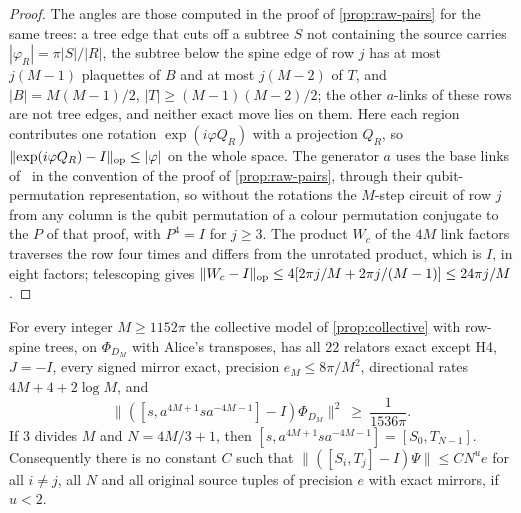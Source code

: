 \begin{proof}
The angles are those computed in the proof of \cref{prop:raw-pairs} for the same trees: a tree edge that cuts off a subtree $S$ not
containing the source carries $|\varphi_R|=\pi|S|/|R|$, the subtree below the spine edge of row $j$ has at most $j(M-1)$ plaquettes of $B$
and at most $j(M-2)$ of $T$, and $|B|=M(M-1)/2$, $|T|\ge(M-1)(M-2)/2$; the other $a$-links of these rows are not tree edges, and neither
exact move lies on them. Here each region contributes one rotation $\exp(i\varphi Q_R)$ with a projection $Q_R$, so
$\lVert \exp(i\varphi Q_R)-I\rVert_{\mathrm{op}}\le|\varphi|$ on the whole space. The generator $a$ uses the base links of~\cite[\S6]{DM-H3} in the convention of
the proof of \cref{prop:raw-pairs}, through their qubit-permutation representation, so without the rotations the $M$-step circuit of
row $j$ from any column is the qubit permutation of a colour permutation conjugate to the $P$ of that proof, with $P^4=I$ for $j\ge3$.
The product $W_c$ of the $4M$ link factors traverses the row four times and differs from the unrotated product, which is $I$, in eight
factors; telescoping gives $\lVert W_c-I\rVert_{\mathrm{op}}\le4[2\pi j/M+2\pi j/(M-1)]\le24\pi j/M$.
\end{proof}

\begin{theorem}\label{thm:raw-obstruction}
For every integer $M\ge1152\pi$ the collective model of \cref{prop:collective} with row-spine trees, on $\Phi_{D_M}$ with Alice's
transposes, has all $22$ relators exact except H4, $J=-I$, every signed mirror exact, precision $e_M\le8\pi/M^2$, directional rates
$4M+4+2\log M$, and
\[
\|([s,a^{4M+1}sa^{-4M-1}]-I)\Phi_{D_M}\|^2\ \ge\ \frac1{1536\pi}. \tag{O}
\]
If $3$ divides $M$ and $N=4M/3+1$, then $[s,a^{4M+1}sa^{-4M-1}]=[S_0,T_{N-1}]$. Consequently there is no constant $C$ such that
$\|([S_i,T_j]-I)\Psi\|\le CN^ue$ for all $i\ne j$, all $N$ and all original source tuples of precision $e$ with exact mirrors, if $u<2$.
\end{theorem}

